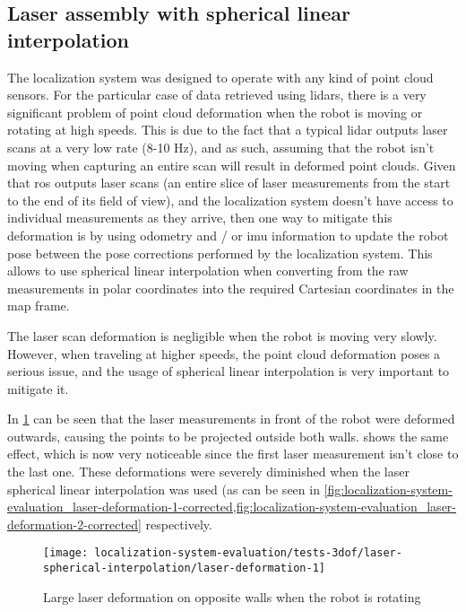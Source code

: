 \subsection{Laser assembly with spherical linear interpolation}

The localization system was designed to operate with any kind of point cloud sensors. For the particular case of data retrieved using \glspl{lidar}, there is a very significant problem of point cloud deformation when the robot is moving or rotating at high speeds. This is due to the fact that a typical \gls{lidar} outputs laser scans at a very low rate (8-10 Hz), and as such, assuming that the robot isn't moving when capturing an entire scan will result in deformed point clouds. Given that \gls{ros} outputs laser scans (an entire slice of laser measurements from the start to the end of its field of view), and the localization system doesn't have access to individual measurements as they arrive, then one way to mitigate this deformation is by using odometry and / or \gls{imu} information to update the robot pose between the pose corrections performed by the localization system. This allows to use spherical linear interpolation when converting from the raw measurements in polar coordinates into the required Cartesian coordinates in the map frame.

The laser scan deformation is negligible when the robot is moving very slowly. However, when traveling at higher speeds, the point cloud deformation poses a serious issue, and the usage of spherical linear interpolation is very important to mitigate it.

In \cref{fig:localization-system-evaluation_laser-deformation-1} can be seen that the laser measurements in front of the robot were deformed outwards, causing the points to be projected outside both walls.  shows the same effect, which is now very noticeable since the first laser measurement isn't close to the last one. These deformations were severely diminished when the laser spherical linear interpolation was used (as can be seen in \cref{fig:localization-system-evaluation_laser-deformation-1-corrected,fig:localization-system-evaluation_laser-deformation-2-corrected} respectively.


\begin{figure}[ht]
	\centering
	\texttt{[image: localization-system-evaluation/tests-3dof/laser-spherical-interpolation/laser-deformation-1]}
	\caption{Large laser deformation on opposite walls when the robot is rotating}
	\label{fig:localization-system-evaluation_laser-deformation-1}
\end{figure}

